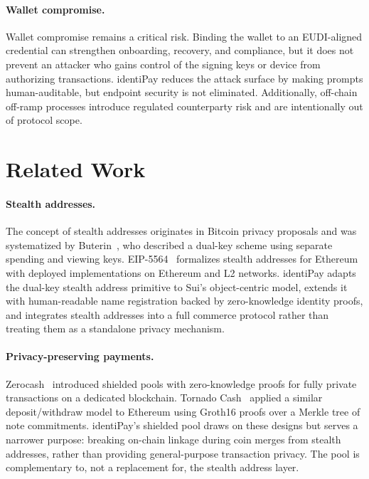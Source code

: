\documentclass[11pt]{article}
\begin{document}
\paragraph{Wallet compromise.}
Wallet compromise remains a critical risk. Binding the wallet to an EUDI-aligned credential can strengthen onboarding, recovery, and compliance, but it does not prevent an attacker who gains control of the signing keys or device from authorizing transactions. identiPay reduces the attack surface by making prompts human-auditable, but endpoint security is not eliminated. Additionally, off-chain off-ramp processes introduce regulated counterparty risk and are intentionally out of protocol scope.

\section{Related Work}

\paragraph{Stealth addresses.}
The concept of stealth addresses originates in Bitcoin privacy proposals and was systematized by Buterin~\cite{buterin-stealth}, who described a dual-key scheme using separate spending and viewing keys. EIP-5564~\cite{eip5564} formalizes stealth addresses for Ethereum with deployed implementations on Ethereum and L2 networks. identiPay adapts the dual-key stealth address primitive to Sui's object-centric model, extends it with human-readable name registration backed by zero-knowledge identity proofs, and integrates stealth addresses into a full commerce protocol rather than treating them as a standalone privacy mechanism.

\paragraph{Privacy-preserving payments.}
Zerocash~\cite{zerocash} introduced shielded pools with zero-knowledge proofs for fully private transactions on a dedicated blockchain. Tornado Cash~\cite{tornadocash} applied a similar deposit/withdraw model to Ethereum using Groth16 proofs over a Merkle tree of note commitments. identiPay's shielded pool draws on these designs but serves a narrower purpose: breaking on-chain linkage during coin merges from stealth addresses, rather than providing general-purpose transaction privacy. The pool is complementary to, not a replacement for, the stealth address layer.
\end{document}
